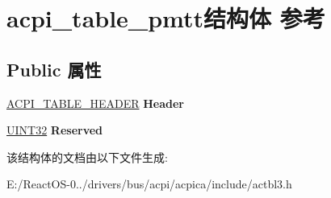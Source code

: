 \hypertarget{structacpi__table__pmtt}{}\section{acpi\+\_\+table\+\_\+pmtt结构体 参考}
\label{structacpi__table__pmtt}
\subsection*{Public 属性}
\begin{DoxyCompactItemize}
\item 
\mbox{\label{structacpi__table__pmtt_a8028ce801e8f57682c85b91ea64f88fb}} 
\hyperlink{structacpi__table__header}{A\+C\+P\+I\+\_\+\+T\+A\+B\+L\+E\+\_\+\+H\+E\+A\+D\+ER} {\bfseries Header}
\item 
\mbox{\label{structacpi__table__pmtt_a3a38a2afaf74fedf4609b4e258946905}} 
\hyperlink{_processor_bind_8h_ae1e6edbbc26d6fbc71a90190d0266018}{U\+I\+N\+T32} {\bfseries Reserved}
\end{DoxyCompactItemize}


该结构体的文档由以下文件生成\+:\begin{DoxyCompactItemize}
\item 
E\+:/\+React\+O\+S-\/0../drivers/bus/acpi/acpica/include/actbl3.\+h\end{DoxyCompactItemize}
